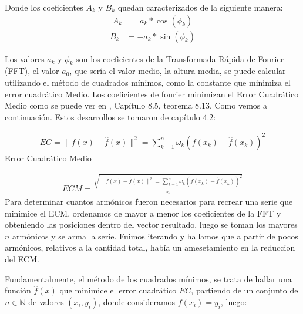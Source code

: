 \documentclass[10pt,a4paper]{article}
\numberwithin{equation}{section}
\numberwithin{figure}{section}
\numberwithin{table}{section}
\begin{document}
Donde los coeficientes $A_k$ y $B_k$ quedan caracterizados de la siguiente manera:
\begin{equation}\label{eqn:eq_3_1}
    \begin{split}
        A_k &= a_k*\cos(\phi_k)
    \end{split}
\end{equation}
\begin{equation}\label{eqn:eq_3_2}
    \begin{split}
        B_k &= -a_k*\sin(\phi_k)
    \end{split}
\end{equation}

Los valores $a_k$ y $\phi_k$ son los coeficientes de la Transformada Rápida de Fourier (FFT), el valor $a_0$, que sería el valor medio, la altura media, se puede calcular
utilizando el método de cuadrados mínimos, como la constante que minimiza el error cuadrático Medio. Los coeficientes de fourier minimizan el Error Cuadrático Medio como se puede ver en \cite{ana2}, Capítulo 8.5, teorema 8.13.
Como vemos a continuación. Estos desarrollos  se tomaron de \cite{ana1} capítulo 4.2:

\begin{equation}\label{eq_4}
    \begin{split}
        EC = \parallel f(x) - \hat{f}(x) \parallel^2 = \sum_{k=1}^{n} \omega_k (f(x_k)-\hat{f}(x_k))^2
    \end{split}
\end{equation}
Error Cuadrático Medio

\begin{equation}\label{eq_4_2}
    \begin{split}
        ECM =  \frac{\sqrt{\parallel f(x) - \hat{f}(x) \parallel^2 = \sum_{k=1}^{n} \omega_k (f(x_k)-\hat{f}(x_k))^2}}{n}
    \end{split}
\end{equation}
Para determinar cuantos armónicos fueron necesarios para recrear una serie que minimice el ECM, ordenamos de mayor a menor los coeficientes de la FFT y obteniendo las posiciones dentro del vector resultado, luego se toman los mayores $n$ armónicos y se arma la serie.
Fuimos iterando y hallamos que a partir de pocos armónicos, relativos a la cantidad total, había un amesetamiento en la reduccion del ECM.

Fundamentalmente, el método de los cuadrados mínimos, se trata de hallar una función $\hat{f}(x)$ que minimice el error cuadrático $EC$, partiendo de un conjunto
 de $n \in \mathbb{N}$ de valores $(x_i,y_i)$, donde consideramos $f(x_i) = y_i$, luego:
\end{document}
